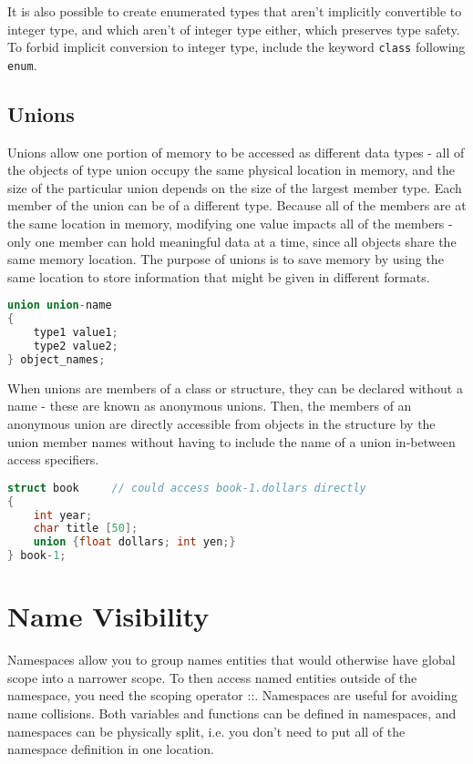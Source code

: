 \documentclass[10pt]{article}
\begin{document}
It is also possible to create enumerated types that aren't implicitly convertible to integer type, and which aren't of integer type either, which preserves type safety. To forbid implicit conversion to integer type, include the keyword \texttt{class} following \texttt{enum}.

\subsection{Unions}

Unions allow one portion of memory to be accessed as different data types - all of the objects of type union occupy the same physical location in memory, and the size of the particular union depends on the size of the largest member type. Each member of the union can be of a different type. Because all of the members are at the same location in memory, modifying one value impacts all of the members - only one member can hold meaningful data at a time, since all objects share the same memory location. The purpose of unions is to save memory by using the same location to store information that might be given in different formats.

\begin{lstlisting}[language=C++]
union union-name
{
    type1 value1;
    type2 value2;
} object_names;
\end{lstlisting}

When unions are members of a class or structure, they can be declared without a name - these are known as anonymous unions. Then, the members of an anonymous union are directly accessible from objects in the structure by the union member names without having to include the name of a union in-between access specifiers.

\begin{lstlisting}[language=C++]
struct book		// could access book-1.dollars directly
{
    int year;
    char title [50];
    union {float dollars; int yen;}
} book-1;
\end{lstlisting}

\section{Name Visibility}

Namespaces allow you to group names entities that would otherwise have global scope into a narrower scope. To then access named entities outside of the namespace, you need the scoping operator ::. Namespaces are useful for avoiding name collisions. Both variables and functions can be defined in namespaces, and namespaces can be physically split, i.e. you don't need to put all of the namespace definition in one location. 
\end{document}
